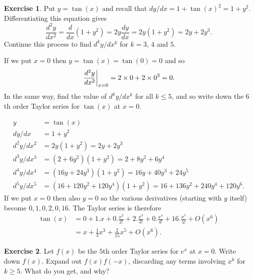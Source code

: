 \documentclass[a4paper]{amsart}
\theoremstyle{definition}
\newtheorem{exercise}{Exercise}[section]
\newenvironment{solution}{{\noindent \bf Solution:}}{}
\begin{document}
\begin{exercise}\label{ex-taylor-tan}
 Put $y=\tan(x)$ and recall that $dy/dx=1+\tan(x)^2=1+y^2$.
 Differentiating this equation gives
 \[ \frac{d^2y}{dx^2} = 
     \frac{d}{dx}(1+y^2) = 
     2y\frac{dy}{dx} = 2y(1+y^2) = 2y + 2y^3.
 \]
 Continue this process to find $d^ky/dx^k$ for $k=3$, $4$
 and $5$.

 If we put $x=0$ then $y=\tan(x)=\tan(0)=0$ and so 
 \[ \left.\frac{d^2y}{dx^2}\right|_{x=0} =
     2\times 0 + 2\times 0^3 = 0.
 \]
 In the same way, find the value of $d^ky/dx^k$ for all
 $k\leq 5$, and so write down the $6$th order Taylor series
 for $\tan(x)$ at $x=0$.
\end{exercise}
\begin{solution}
\begin{align*}
  y         &= \tan(x) \\
  dy/dx     &= 1 + y^2 \\
  d^2y/dx^2 &= 2y(1+y^2) = 2y + 2y^3 \\
  d^3y/dx^3 &= (2+6y^2)(1+y^2) = 2 + 8y^2 + 6y^4 \\
  d^4y/dx^4 &= (16y+24y^3)(1+y^2) = 16y+40y^3+24y^5 \\
  d^5y/dx^5 &= (16+120y^2+120y^4)(1+y^2) = 16+136y^2+240y^4+120y^6.
 \end{align*}
 If we put $x=0$ then also $y=0$ so the various derivatives
 (starting with $y$ itself) become $0,1,0,2,0,16$.  The
 Taylor series is therefore
 \begin{align*}
  \tan(x) &= 0 + 1.x + 0.\frac{x^2}{2!} +
             2.\frac{x^3}{3!} + 0.\frac{x^4}{4!} + 
             16.\frac{x^5}{5!} + O(x^6) \\
          &= x + \frac{1}{3}x^3 +
             \frac{2}{15}x^5 + O(x^6).
 \end{align*}
\end{solution}
\begin{exercise}\label{ex-taylor-exp-inv}
Let $f(x)$ be the $5$th order Taylor series for $e^x$ at $x=0$.
Write down $f(x)$.  Expand out $f(x)f(-x)$, discarding any
terms involving $x^k$ for $k\geq 5$.  What do you get, and
why?
\end{exercise}
\end{document}
